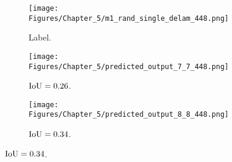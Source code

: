 \begin{figure} [h!]
	\centering
	\begin{subfigure}[b]{0.32\textwidth}
		\centering
		\texttt{[image: Figures/Chapter\_5/m1\_rand\_single\_delam\_448.png]}
		\caption{Label.}
		\label{fig:GT_case_448}
	\end{subfigure}	
	\hfill
	\begin{subfigure}[b]{0.32\textwidth}
		\centering
		\texttt{[image: Figures/Chapter\_5/predicted\_output\_7\_7\_448.png]}
		\caption{\(\textup{IoU}=0.26\).}
		\label{fig:pred_7_7_case_448}
	\end{subfigure}
	\hfill
	\begin{subfigure}[b]{0.32\textwidth}
		\centering
		\texttt{[image: Figures/Chapter\_5/predicted\_output\_8\_8\_448.png]}
		\caption{\(\textup{IoU}=0.34\).}
		\label{fig:pred_8_8_case_448}
	\end{subfigure}	


\end{figure}
